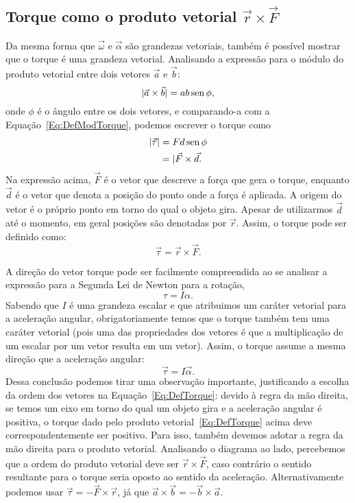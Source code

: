\subsection{Torque como o produto vetorial $\vec{r}\times\vec{F}$}

Da mesma forma que $\vec{\omega}$ e $\vec{\alpha}$ são grandezas vetoriais, também é possível mostrar que o torque é uma grandeza vetorial. Analisando a expressão para o módulo do produto vetorial entre dois vetores $\vec{a}$ e $\vec{b}$:
\begin{equation}
  |\vec{a}\times\vec{b}| = ab\operatorname{sen}\phi,
\end{equation}
%
onde $\phi$ é o ângulo entre os dois vetores, e comparando-a com a Equação~\eqref{Eq:DefModTorque}, podemos escrever o torque como
\begin{align}
  |\vec{\tau}| &= F d \operatorname{sen}\phi \\
  &= |\vec{F}\times\vec{d}.
\end{align}
%
Na expressão acima, $\vec{F}$ é o vetor que descreve a força que gera o torque, enquanto $\vec{d}$ é o vetor que denota a posição do ponto onde a força é aplicada. A origem do vetor é o próprio ponto em torno do qual o objeto gira. Apesar de utilizarmos $\vec{d}$ até o momento, em geral posições são denotadas por $\vec{r}$. Assim, o torque pode ser definido como: 
\begin{equation}\label{Eq:DefTorque}
  \vec{\tau} = \vec{r}\times\vec{F}.
\end{equation}

A direção do vetor torque pode ser facilmente compreendida ao se analisar a expressão para a Segunda Lei de Newton para a rotação,
\begin{equation}
  \tau = I \alpha.
\end{equation}
%
Sabendo que $I$ é uma grandeza escalar e que atribuimos um caráter vetorial para a aceleração angular, obrigatoriamente temos que o torque também tem uma caráter vetorial (pois uma das propriedades dos vetores é que a multiplicação de um escalar por um vetor resulta em um vetor). Assim, o torque assume a mesma direção que a aceleração angular:
\begin{equation}
  \vec{\tau} = I\vec{\alpha}.
\end{equation}
%
Dessa conclusão podemos tirar uma observação importante, justificando a escolha da ordem dos vetores na Equação~\eqref{Eq:DefTorque}: devido à regra da mão direita, se temos um eixo em torno do qual um objeto gira e a aceleração angular é positiva, o torque dado pelo produto vetorial~\eqref{Eq:DefTorque} acima deve correspondentemente ser positivo. Para isso, também devemos adotar a regra da mão direita para o produto vetorial. Analisando o diagrama ao lado, percebemos que a ordem do produto vetorial deve ser $\vec{r}\times\vec{F}$, caso contrário o sentido resultante para o torque seria oposto ao sentido da aceleração. Alternativamente podemos usar $\vec{\tau} = -\vec{F}\times\vec{r}$, já que $\vec{a}\times\vec{b} = - \vec{b}\times\vec{a}$.

